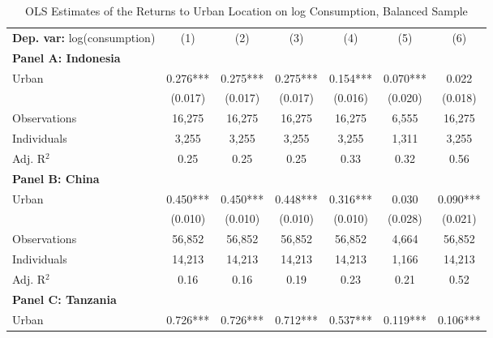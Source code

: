 \begin{table}[htbp] \centering \begin{threeparttable}
 \caption{OLS Estimates of the Returns to Urban Location on log Consumption, Balanced Sample} 
 \label{tab:OLS_cons_urb_bal} 
\begin{tabular}{l cccccc} \toprule  \textbf{Dep. var:}  log(consumption) 
                    &\multicolumn{1}{c}{(1)}   &\multicolumn{1}{c}{(2)}   &\multicolumn{1}{c}{(3)}   &\multicolumn{1}{c}{(4)}   &\multicolumn{1}{c}{(5)}   &\multicolumn{1}{c}{(6)}   \\
\textbf{Panel A: Indonesia} \\
Urban               &       0.276***&       0.275***&       0.275***&       0.154***&       0.070***&       0.022   \\
                    &     (0.017)   &     (0.017)   &     (0.017)   &     (0.016)   &     (0.020)   &     (0.018)   \\
\addlinespace
Observations        &      16,275   &      16,275   &      16,275   &      16,275   &       6,555   &      16,275   \\
Individuals         &       3,255   &       3,255   &       3,255   &       3,255   &       1,311   &       3,255   \\
Adj. R$^{2}$        &        0.25   &        0.25   &        0.25   &        0.33   &        0.32   &        0.56   \\
\cmidrule{2 -7}
\textbf{Panel B: China} \\
Urban               &       0.450***&       0.450***&       0.448***&       0.316***&       0.030   &       0.090***\\
                    &     (0.010)   &     (0.010)   &     (0.010)   &     (0.010)   &     (0.028)   &     (0.021)   \\
\addlinespace
Observations        &      56,852   &      56,852   &      56,852   &      56,852   &       4,664   &      56,852   \\
Individuals         &      14,213   &      14,213   &      14,213   &      14,213   &       1,166   &      14,213   \\
Adj. R$^{2}$        &        0.16   &        0.16   &        0.19   &        0.23   &        0.21   &        0.52   \\
\cmidrule{2-7}
\textbf{Panel C: Tanzania} \\
Urban               &       0.726***&       0.726***&       0.712***&       0.537***&       0.119***&       0.106***\\

\end{tabular}
\end{threeparttable}
\end{table}
